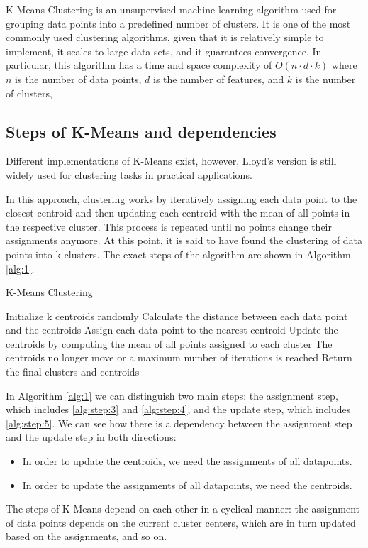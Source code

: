 K-Means Clustering is an unsupervised machine learning algorithm used for grouping data points into a predefined number of clusters. It is one of the most commonly used clustering algorithms, given that it is relatively simple to implement, it scales to large data sets, and it guarantees convergence. In particular, this algorithm has a time and space complexity of $O(n\cdot d\cdot k)$ where $n$ is the number of data points, $d$ is the number of features, and  $k$ is the number of clusters,

\subsection{Steps of K-Means and dependencies}

Different implementations of K-Means exist, however, Lloyd's version is still widely used for clustering tasks in practical applications.

In this approach, clustering works by iteratively assigning each data point to the closest centroid and then updating each centroid with the mean of all points in the respective cluster. This process is repeated until no points change their assignments anymore. At this point, it is said to have found the clustering of data points into k clusters. The exact steps of the algorithm are shown in Algorithm \ref{alg:1}.

\begin{algorithm}
\caption{K-Means Clustering}
\begin{algorithmic}[1]
    \State Initialize k centroids randomly
    \Repeat
    \State Calculate the distance between each data point and the centroids
    \label{alg:step:3}
    \State Assign each data point to the nearest centroid
    \label{alg:step:4}
    \State Update the centroids by computing the mean of all points assigned to each cluster
    \label{alg:step:5}
    \Until The centroids no longer move or a maximum number of iterations is reached
    \State Return the final clusters and centroids
\end{algorithmic}
\label{alg:1}
\end{algorithm}

In Algorithm \ref{alg:1}  we can distinguish two main steps: the assignment step, which includes \ref{alg:step:3} and \ref{alg:step:4}, and the update step, which includes \ref{alg:step:5}.
We can see how there is a dependency between the assignment step and the update step in both directions:
\begin{itemize}
    \item In order to update the centroids, we need the assignments of all datapoints.
    \item In order to update the assignments of all datapoints, we need the centroids.
\end{itemize}
The steps of K-Means depend on each other in a cyclical manner: the assignment of data points depends on the current cluster centers, which are in turn updated based on the assignments, and so on.


